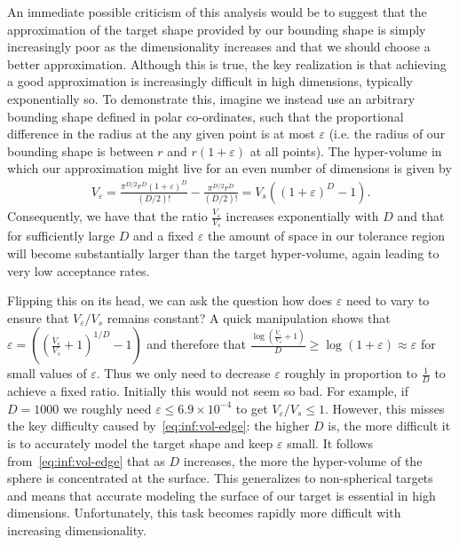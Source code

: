 An immediate possible criticism of this analysis would be to suggest that the approximation of the
target shape provided by our bounding shape is simply increasingly poor as the dimensionality 
increases and that we should choose 
a better approximation.  Although this is true, the key realization is that achieving a good approximation
is increasingly difficult in high dimensions, typically exponentially so.
To demonstrate this, imagine we instead use an arbitrary bounding shape defined in polar
co-ordinates, such that the proportional difference in the radius at the any given point is at most $\varepsilon$
(i.e. the radius of our bounding shape is between $r$ and $r(1+\varepsilon)$ at all points).
The hyper-volume in which our approximation might live for an even number of dimensions
is given by
\begin{align}
\label{eq:inf:vol-edge}
V_{\varepsilon} = \frac{\pi^{D/2}r^D(1+\varepsilon)^D}{(D/2)!}-\frac{\pi^{D/2}r^D}{(D/2)!}
= V_s \left(\left(1+\varepsilon\right)^D-1\right).
\end{align}
Consequently, we have that the ratio $\frac{V_{\varepsilon}}{V_s}$ increases exponentially with $D$
and that for sufficiently large $D$ and a fixed $\varepsilon$ the amount of space in our tolerance
region will become substantially larger than the target hyper-volume, again leading to very low acceptance
rates.

Flipping this on its head, we can ask the question how does $\varepsilon$ need to vary
to ensure that $V_{\varepsilon}/V_s$ remains constant?  A quick manipulation shows
that $\varepsilon = \left(\left(\frac{V_{\varepsilon}}{V_s}+1\right)^{1/D}-1\right)$ and therefore that
$\frac{\log \left(\frac{V_{\varepsilon}}{V_s}+1\right)}{D} \ge \log(1+\varepsilon) \approx \varepsilon$
for small values of $\varepsilon$.  Thus we only need to decrease $\varepsilon$ roughly
in proportion to $\frac{1}{D}$ to achieve a fixed ratio.  Initially this would not seem
so bad.  For example, if $D=1000$ we
roughly need $\varepsilon \le 6.9 \times 10^{-4}$ to get $V_{\varepsilon}/V_s \le 1$.
However, this misses the
key difficulty caused by~\eqref{eq:inf:vol-edge}: the higher $D$ is, the more difficult it is
to accurately model the target shape and keep $\varepsilon$ small.  
It follows from~\eqref{eq:inf:vol-edge} that as $D$ increases, the more the hyper-volume
of the sphere is concentrated at the surface.  This generalizes to non-spherical targets and
means that accurate modeling the surface of our target is essential in high dimensions.
Unfortunately, this task becomes rapidly more difficult with increasing dimensionality.  


